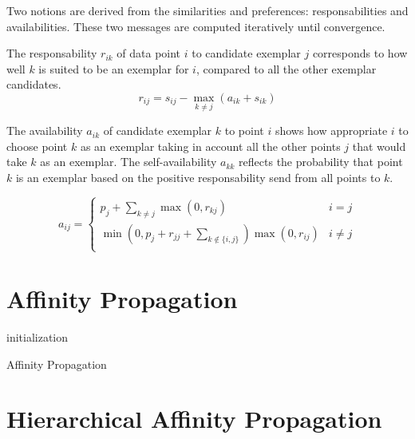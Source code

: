 \documentclass{ipol}
\begin{document}
Two notions are derived from the similarities and preferences:
responsabilities and availabilities. These two messages are computed
iteratively until convergence.

The responsability $r_{ik}$ of data point $i$ to candidate exemplar $j$ corresponds to
how well $k$ is suited to be an exemplar for $i$, compared to all the other
exemplar candidates. \\
\begin{equation*}
r_{ij} = s_{ij} - \max_{k \neq j} (a_{ik} + s_{ik})
\end{equation*}

The availability $a_{ik}$ of candidate exemplar $k$ to point $i$ shows how
appropriate $i$ to choose point $k$ as an exemplar taking in account all the
other points $j$ that would take $k$ as an exemplar. The self-availability
$a_{kk}$ reflects the probability that point $k$ is an exemplar based on the
positive responsability send from all points to $k$.

\begin{equation*}
a_{ij} = \begin{cases}
	    p_j + \sum_{k \neq j} \max(0, r_{kj}) &  i = j \\
	    \min ( 0, p_j + r_{jj} + \sum_{k \notin \{i, j\} } ) \max (0, r_{ij})
	    & i \neq j\\
	 \end{cases}
\end{equation*}


\section{Affinity Propagation}

\begin{algorithm}[H]
     \SetLine

     initialization\;
     \caption{Affinity Propagation}
\end{algorithm}


\section{Hierarchical Affinity Propagation}


\end{document}
